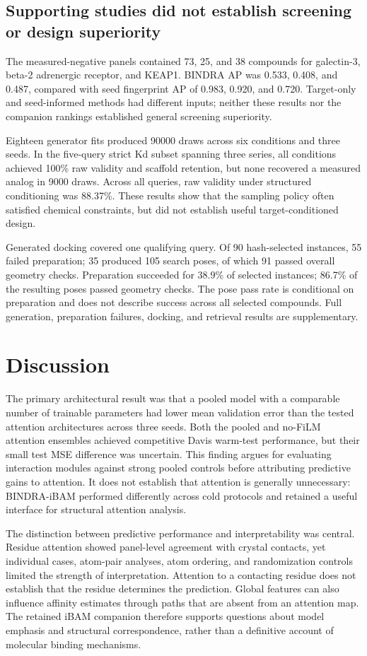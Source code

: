 \documentclass[12pt,a4paper]{article}
\begin{document}
\subsection*{Supporting studies did not establish screening or design superiority}
The measured-negative panels contained 73, 25, and 38 compounds for galectin-3, beta-2 adrenergic receptor, and KEAP1. BINDRA AP was 0.533, 0.408, and 0.487, compared with seed fingerprint AP of 0.983, 0.920, and 0.720. Target-only and seed-informed methods had different inputs; neither these results nor the companion rankings established general screening superiority.

Eighteen generator fits produced 90000 draws across six conditions and three seeds. In the five-query strict Kd subset spanning three series, all conditions achieved 100\% raw validity and scaffold retention, but none recovered a measured analog in 9000 draws. Across all queries, raw validity under structured conditioning was 88.37\%. These results show that the sampling policy often satisfied chemical constraints, but did not establish useful target-conditioned design.

Generated docking covered one qualifying query. Of 90 hash-selected instances, 55 failed preparation; 35 produced 105 search poses, of which 91 passed overall geometry checks. Preparation succeeded for 38.9\% of selected instances; 86.7\% of the resulting poses passed geometry checks. The pose pass rate is conditional on preparation and does not describe success across all selected compounds. Full generation, preparation failures, docking, and retrieval results are supplementary.

\section*{Discussion}
The primary architectural result was that a pooled model with a comparable number of trainable parameters had lower mean validation error than the tested attention architectures across three seeds. Both the pooled and no-FiLM attention ensembles achieved competitive Davis warm-test performance, but their small test MSE difference was uncertain. This finding argues for evaluating interaction modules against strong pooled controls before attributing predictive gains to attention. It does not establish that attention is generally unnecessary: BINDRA-iBAM performed differently across cold protocols and retained a useful interface for structural attention analysis.

The distinction between predictive performance and interpretability was central. Residue attention showed panel-level agreement with crystal contacts, yet individual cases, atom-pair analyses, atom ordering, and randomization controls limited the strength of interpretation. Attention to a contacting residue does not establish that the residue determines the prediction. Global features can also influence affinity estimates through paths that are absent from an attention map. The retained iBAM companion therefore supports questions about model emphasis and structural correspondence, rather than a definitive account of molecular binding mechanisms.
\end{document}
